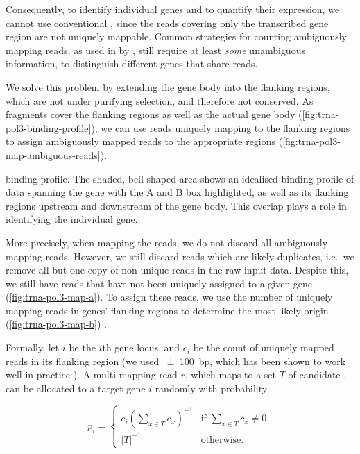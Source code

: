 Consequently, to identify individual \trna genes and to quantify their
expression, we cannot use conventional \rnaseq, since the \rna reads covering
only the transcribed gene region are not uniquely mappable. Common strategies
for counting ambiguously mapping reads, as used in  by
\citet{Mortazavi:2008}, still require at least \emph{some} unambiguous
information, to distinguish different genes that share reads.

We solve this problem by extending the \trna gene body into the flanking
regions, which are not under purifying selection, and therefore not conserved.
As  \chipseq fragments cover the flanking regions as well as the actual
gene body (\cref{fig:trna-pol3-binding-profile}), we can use reads uniquely
mapping to the flanking regions to assign ambiguously mapped reads to the
appropriate regions (\cref{fig:trna-pol3-map-ambiguous-reads}).

    {\trna {} \chip binding profile.}
    {The shaded, bell-shaped area shows an idealised binding profile of \chipseq
    data spanning the \trna gene with the A and B box highlighted, as well as
    its flanking regions upstream and downstream of the gene body. This overlap
    plays a role in identifying the individual gene.}

More precisely, when mapping the reads, we do not discard all ambiguously
mapping reads. However, we still discard reads which are likely \pcr duplicates,
i.e.\ we remove all but one copy of non-unique reads in the raw input data.
Despite this, we still have reads that have not been uniquely assigned to a
given \trna gene (\cref{fig:trna-pol3-map-a}). To assign these reads, we use the
number of uniquely mapping reads in \trna genes’ flanking regions to determine
the most likely origin (\cref{fig:trna-pol3-map-b}) \citep{Kutter:2011}.

Formally, let \(i\) be the \(i\)th \trna gene locus, and \(c_i\) be the count of
uniquely mapped reads in its flanking region (we used \SI{\pm100}{bp}, which has
been shown to work well in practice \citep{Kutter:2011}). A multi-mapping read
\(r\), which maps to a set \(T\) of candidate \trna[s], can be allocated to a
target \trna gene \(i\) randomly with probability

\begin{equation}
    p_i = \begin{cases}
        c_i\left(\sum_{x \in T}c_x\right)^{-1} &
            \text{if \(\sum_{x \in T}c_x \neq 0\),} \\
        \vert T \rvert^{-1} & \text{otherwise.}
    \end{cases}
\end{equation}

